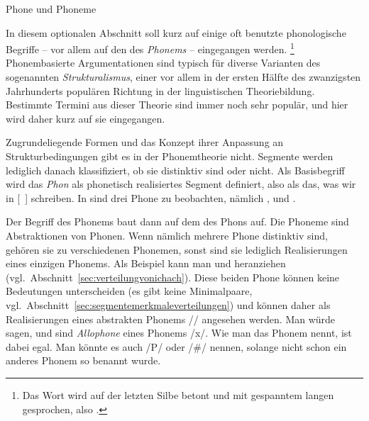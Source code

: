 \begin{Vertiefung}{Phone und Phoneme}

\label{sec:phonephoneme}

\noindent In diesem optionalen Abschnitt soll kurz auf einige oft benutzte phonologische Begriffe -- vor allem auf den des \textit{Phonems} -- eingegangen werden.%
\footnote{Das Wort wird auf der letzten Silbe betont und mit gespanntem langen \textipa{[e:]} gesprochen, also \textipa{[fo}\Akz \textipa{ne:m]}.}
Phonembasierte Argumentationen sind typisch für diverse Varianten des sogenannten \textit{Strukturalismus}, einer vor allem in der ersten Hälfte des zwanzigsten Jahrhunderts populären Richtung in der linguistischen Theoriebildung.
Bestimmte Termini aus dieser Theorie sind immer noch sehr populär, und hier wird daher kurz auf sie eingegangen.

Zugrundeliegende Formen und das Konzept ihrer Anpassung an Strukturbedingungen gibt es in der Phonemtheorie nicht.
Segmente werden lediglich danach klassifiziert, ob sie distinktiv sind oder nicht.
Als Basisbegriff wird das \textit{Phon} als phonetisch realisiertes Segment definiert, also als das, was wir in [~] schreiben.
In \textipa{[ta:k]} sind drei Phone zu beobachten, nämlich \textipa{[t]}, \textipa{[a:]} und \textipa{[k]}.


Der Begriff des Phonems baut dann auf dem des Phons auf.
Die Phoneme sind Abstraktionen von Phonen.
Wenn nämlich mehrere Phone distinktiv sind, gehören sie zu verschiedenen Phonemen, sonst sind sie lediglich Realisierungen eines einzigen Phonems.
Als Beispiel kann man \textipa{[\c{c}]} und \textipa{[X]} heranziehen (vgl.\ Abschnitt~\ref{sec:verteilungvonichach}).
Diese beiden Phone können keine Bedeutungen unterscheiden (es gibt keine Minimalpaare, vgl.\ Abschnitt~\ref{sec:segmentemerkmaleverteilungen}) und können daher als Realisierungen eines abstrakten Phonems // angesehen werden.
Man würde sagen, \textipa{[\c{c}]} und \textipa{[X]} sind \textit{Allophone} eines Phonems /x/.
Wie man das Phonem nennt, ist dabei egal.
Man könnte es auch /P/ oder /\#/ nennen, solange nicht schon ein anderes Phonem so benannt wurde.



\end{Vertiefung}
